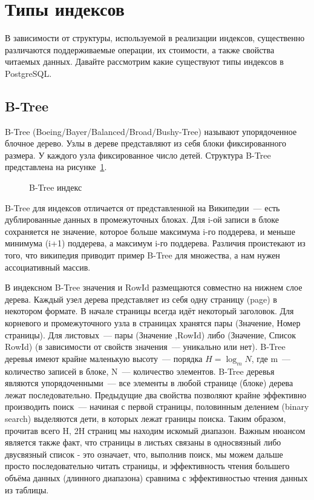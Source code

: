 \section{Типы индексов}

В зависимости от структуры, используемой в реализации индексов, существенно различаются поддерживаемые операции, их стоимости, а также свойства читаемых данных. Давайте рассмотрим какие существуют типы индексов в PostgreSQL.


\subsection{B-Tree}

B-Tree (Boeing/Bayer/Balanced/Broad/Bushy-Tree) называют упорядоченное блочное дерево. Узлы в дереве представляют из себя блоки фиксированного размера. У каждого узла фиксированное число детей. Структура B-Tree представлена на рисунке~\ref{fig:btree_index}.

\begin{figure}[ht!]
  \caption{B-Tree индекс}
  \label{fig:btree_index}
\end{figure}

B-Tree для индексов отличается от представленной на Википедии~--- есть дублированные данных в промежуточных блоках. Для i-ой записи в блоке сохраняется не значение, которое больше максимума i-го поддерева, и меньше минимума (i+1) поддерева, а максимум i-го поддерева. Различия проистекают из того, что википедия приводит пример B-Tree для множества, а нам нужен ассоциативный массив.

В индексном B-Tree значения и RowId размещаются совместно на нижнем слое дерева. Каждый узел дерева представляет из себя одну страницу (page) в некотором формате. В начале страницы всегда идёт некоторый заголовок. Для корневого и промежуточного узла в страницах хранятся пары (Значение, Номер страницы). Для листовых~--- пары (Значение ,RowId) либо (Значение, Список RowId) (в зависимости от свойств значения~--- уникально или нет). B-Tree деревья имеют крайне маленькую высоту~--- порядка $H = \log_m{N}$, где m~--- количество записей в блоке, N~--- количество элементов. B-Tree деревья являются упорядоченными~--- все элементы в любой странице (блоке) дерева лежат последовательно. Предыдущие два свойства позволяют крайне эффективно производить поиск~--- начиная с первой страницы, половинным делением (binary search) выделяются дети, в которых лежат границы поиска. Таким образом, прочитав всего H, 2H страниц мы находим искомый диапазон. Важным нюансом является также факт, что страницы в листьях связаны в односвязный либо двусвязный список - это означает, что, выполнив поиск, мы можем дальше просто последовательно читать страницы, и эффективность чтения большего объёма данных (длинного диапазона) сравнима с эффективностью чтения данных из таблицы.

